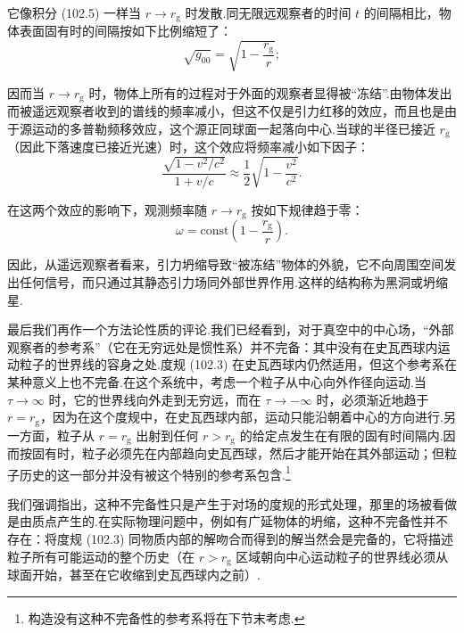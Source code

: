 它像积分 (102.5) 一样当 $r\to r_{\mathrm{g}}$ 时发散.同无限远观察者的时间 $t$ 的间隔相比，物体表面固有时的间隔按如下比例缩短了：
\begin{equation*}
  \sqrt{g_{00}}=\sqrt{1-\frac{r_{\mathrm{g}}}{r}};
\end{equation*}

因而当 $r\to r_{\mathrm{g}}$ 时，物体上所有的过程对于外面的观察者显得被“冻结”.由物体发出而被遥远观察者收到的谱线的频率减小，但这不仅是引力红移的效应，而且也是由于源运动的多普勒频移效应，这个源正同球面一起落向中心.当球的半径已接近 $r_{\mathrm{g}}$（因此下落速度已接近光速）时，这个效应将频率减小如下因子：
\begin{equation*}
  \frac{\sqrt{1-v^{2}/c^{2}}}{1+v/c}
  \approx\frac{1}{2}\sqrt{1-\frac{v^{2}}{c^{2}}}.
\end{equation*}

在这两个效应的影响下，观测频率随 $r\to r_{\mathrm{g}}$ 按如下规律趋于零：
\begin{equation}
  \omega=\mathrm{const}\left(1-\frac{r_{\mathrm{g}}}{r}\right).
\end{equation}

因此，从遥远观察者看来，引力坍缩导致“被冻结”物体的外貌，它不向周围空间发出任何信号，而只通过其静态引力场同外部世界作用.这样的结构称为黑洞或坍缩星.

最后我们再作一个方法论性质的评论.我们已经看到，对于真空中的中心场，“外部观察者的参考系”（它在无穷远处是惯性系）并不完备：其中没有在史瓦西球内运动粒子的世界线的容身之处.度规 (102.3) 在史瓦西球内仍然适用，但这个参考系在某种意义上也不完备.在这个系统中，考虑一个粒子从中心向外作径向运动.当 $\tau\to\infty$ 时，它的世界线向外走到无穷远，而在 $\tau\to-\infty$ 时，必须渐近地趋于 $r=r_{\mathrm{g}}$，因为在这个度规中，在史瓦西球内部，运动只能沿朝着中心的方向进行.另一方面，粒子从 $r=r_{\mathrm{g}}$ 出射到任何 $r>r_{\mathrm{g}}$ 的给定点发生在有限的固有时间隔内.因而按固有时，粒子必须先在内部趋向史瓦西球，然后才能开始在其外部运动；但粒子历史的这一部分并没有被这个特别的参考系包含.\footnote{构造没有这种不完备性的参考系将在下节末考虑.}

我们强调指出，这种不完备性只是产生于对场的度规的形式处理，那里的场被看做是由质点产生的.在实际物理问题中，例如有广延物体的坍缩，这种不完备性并不存在：将度规 (102.3) 同物质内部的解吻合而得到的解当然会是完备的，它将描述粒子所有可能运动的整个历史（在 $r>r_{\mathrm{g}}$ 区域朝向中心运动粒子的世界线必须从球面开始，甚至在它收缩到史瓦西球内之前）.

